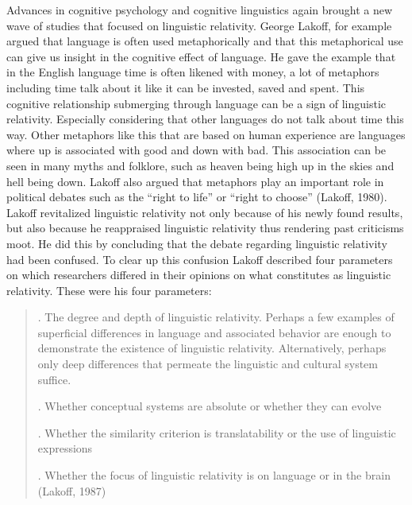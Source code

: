  
	Advances in cognitive psychology and cognitive linguistics again brought a new wave of studies that focused on linguistic relativity. George Lakoff, for example argued that language is often used metaphorically and that this metaphorical use can give us insight in the cognitive effect of language. He gave the example that in the English language time is often likened with money, a lot of metaphors including time talk about it like it can be invested, saved and spent. This cognitive relationship submerging through language can be a sign of linguistic relativity. Especially considering that other languages do not talk about time this way. Other metaphors like this that are based on human experience are languages where up is associated with good and down with bad. This association can be seen in many myths and folklore, such as heaven being high up in the skies and hell being down. Lakoff also argued that metaphors play an important role in political debates such as the “right to life” or “right to choose” (Lakoff, 1980). Lakoff revitalized linguistic relativity not only because of his newly found results, but also because he reappraised linguistic relativity thus rendering past criticisms moot. He did this by concluding that the debate regarding linguistic relativity had been confused. To clear up this confusion Lakoff described four parameters on which researchers differed in their opinions on what constitutes as linguistic relativity. These were his four parameters: 

\begin{quote}
\begin{singlespace}

. The degree and depth of linguistic relativity. Perhaps a few examples of superficial differences in language and associated behavior are enough to demonstrate the existence of linguistic relativity. Alternatively, perhaps only deep differences that permeate the linguistic and cultural system suffice. 

    . Whether conceptual systems are absolute or whether they can evolve 

    . Whether the similarity criterion is translatability or the use of linguistic expressions 

    . Whether the focus of linguistic relativity is on language or in the brain (Lakoff, 1987)

\end{singlespace}
\end{quote}

